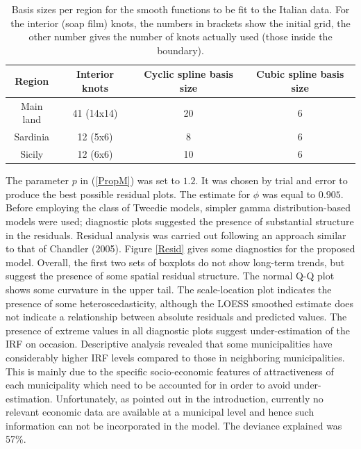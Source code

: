 \begin{table}[t]
\centering
\begin{tabular}{c c c c}\\
Region & Interior knots & Cyclic spline basis size & Cubic spline basis size\\
\hline
Main land & 41 (14x14) & 20 & 6\\
Sardinia & 12 (5x6) & 8 & 6\\
Sicily & 12 (6x6) & 10 & 6\\
\end{tabular}
\caption{Basis sizes per region for the smooth functions to be fit to the Italian data. For the interior (soap film) knots, the numbers in brackets show the initial grid, the other number gives the number of knots actually used (those inside the boundary).}
\label{soap-basis-table}
\end{table}

The parameter $p$ in (\ref{PropM}) was set to $1.2$. It was chosen by trial and error to produce the best possible residual plots. The estimate for $\phi$ was equal to $0.905$. Before employing the class of Tweedie models, simpler gamma distribution-based models were used; diagnostic plots suggested the presence of substantial structure in the residuals. Residual analysis was carried out following an approach similar to that of Chandler (2005). Figure \ref{Resid} gives some diagnostics for the proposed model. Overall, the first two sets of boxplots do not show long-term trends, but suggest the presence of some spatial residual structure. The normal Q-Q plot shows some curvature in the upper tail. The scale-location plot indicates the presence of some heteroscedasticity, although the LOESS smoothed estimate does not indicate a relationship between absolute residuals and predicted values. The presence of extreme values in all diagnostic plots suggest under-estimation of the IRF on occasion. Descriptive analysis revealed that some municipalities have considerably higher IRF levels compared to those in neighboring municipalities. This is mainly due to the specific socio-economic features of attractiveness of each municipality which need to be accounted for in order to avoid under-estimation. Unfortunately, as pointed out in the introduction, currently no relevant economic data are available at a municipal level and hence such information can not be incorporated in the model. The deviance explained was 57\%. 


